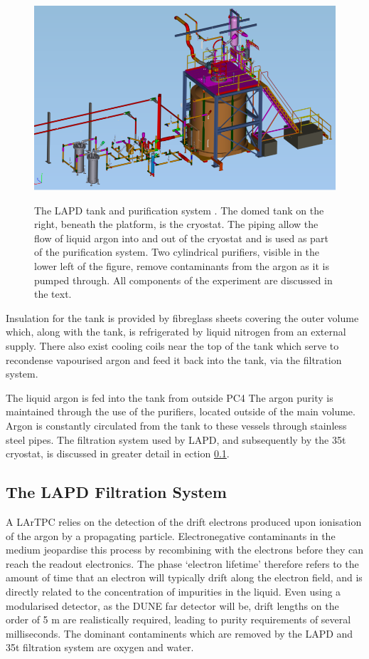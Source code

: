 \begin{figure}[ht]
  \centering
  \includegraphics[width=15cm]{LAPDTankPiping.png}
  \label{fig:LAPDTankPiping}
  \caption{The LAPD tank and purification system \cite{LAPD}.  The domed tank on the right, beneath the platform, is the cryostat.  The piping allow the flow of liquid argon into and out of the cryostat and is used as part of the purification system.  Two cylindrical purifiers, visible in the lower left of the figure, remove contaminants from the argon as it is pumped through.  All components of the experiment are discussed in the text.}
\end{figure}

Insulation for the tank is provided by fibreglass sheets covering the outer volume which, along with the tank, is refrigerated by liquid nitrogen from an external supply.  There also exist cooling coils near the top of the tank which serve to recondense vapourised argon and feed it back into the tank, via the filtration system.

The liquid argon is fed into the tank from outside PC4  The argon purity is maintained through the use of the purifiers, located outside of the main volume.  Argon is constantly circulated from the tank to these vessels through stainless steel pipes.  The filtration system used by LAPD, and subsequently by the 35t cryostat, is discussed in greater detail in ection \ref{sec:LAPDFiltration}.

\subsection{The LAPD Filtration System}\label{sec:LAPDFiltration}

A LArTPC relies on the detection of the drift electrons produced upon ionisation of the argon by a propagating particle.  Electronegative contaminants in the medium jeopardise this process by recombining with the electrons before they can reach the readout electronics.  The phase `electron lifetime' therefore refers to the amount of time that an electron will typically drift along the electron field, and is directly related to the concentration of impurities in the liquid.  Even using a modularised detector, as the DUNE far detector will be, drift lengths on the order of 5 m are realistically required, leading to purity requirements of several milliseconds.  The dominant contaminents which are removed by the LAPD and 35t filtration system are oxygen and water.

